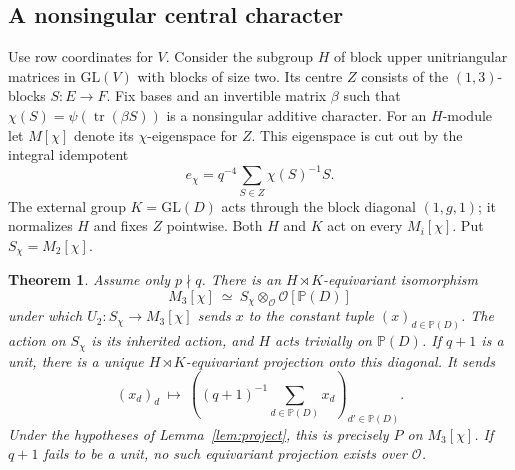 \documentclass[11pt]{article}
\newtheorem{theorem}{Theorem}
\newcommand{\tr}{\operatorname{tr}}
\begin{document}
\subsection{A nonsingular central character}
Use row coordinates for $V$. Consider the subgroup $H$ of block upper
unitriangular matrices in $\mathrm{GL}(V)$ with blocks of size two.
Its centre $Z$ consists of the $(1,3)$-blocks
$S:E\to F$. Fix bases and an invertible matrix $\beta$ such that
$\chi(S)=\psi(\tr(\beta S))$ is a nonsingular additive character. For
an $H$-module let $M[\chi]$ denote its $\chi$-eigenspace for $Z$.
This eigenspace is cut out by the integral idempotent
\[
        e_\chi=q^{-4}\sum_{S\in Z}\chi(S)^{-1}S .
\]
The external group $K=\mathrm{GL}(D)$ acts through the block diagonal
$(1,g,1)$; it normalizes $H$ and fixes $Z$ pointwise. Both $H$ and $K$
act on every $M_i[\chi]$. Put $S_\chi=M_2[\chi]$.

\begin{theorem}\label{thm:fibre}
Assume only $p\nmid q$. There is an $H\rtimes K$-equivariant
isomorphism
\[
 M_3[\chi]\ \simeq\ S_\chi\otimes_{\mathcal O}
                    \mathcal O[\mathbb P(D)]
\]
under which $U_2:S_\chi\to M_3[\chi]$ sends $x$ to the constant tuple
$(x)_{d\in\mathbb P(D)}$. The action on $S_\chi$ is its inherited
action, and $H$ acts trivially on $\mathbb P(D)$. If $q+1$ is a unit,
there is a unique $H\rtimes K$-equivariant projection onto this diagonal.
It sends
\[
 (x_d)_d\ \longmapsto\
   \left((q+1)^{-1}\sum_{d\in\mathbb P(D)}x_d\right)_{d'\in\mathbb P(D)}.
\]
Under the hypotheses of Lemma~\ref{lem:project}, this is precisely
$P$ on $M_3[\chi]$. If $q+1$ fails to be a unit, no such equivariant
projection exists over $\mathcal O$.
\end{theorem}
\end{document}
